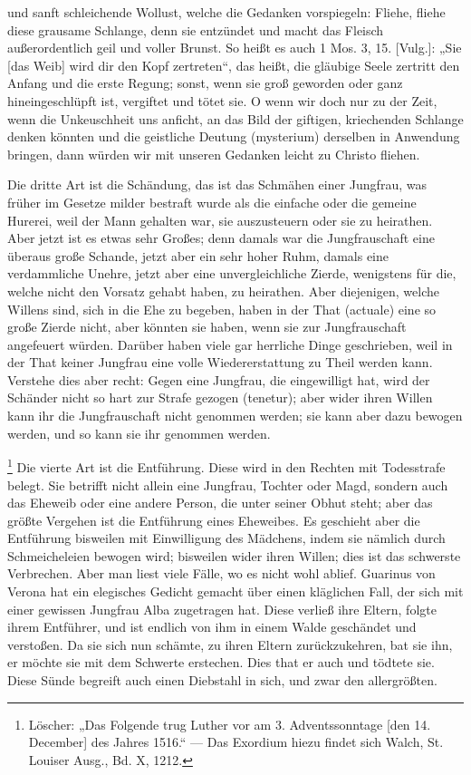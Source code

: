 und sanft schleichende Wollust, welche die Gedanken vorspiegeln: Fliehe, fliehe diese grausame Schlange, denn sie entzündet und macht das Fleisch außerordentlich geil und voller Brunst. So heißt es auch 1 Mos. 3, 15. [Vulg.]: „Sie [das Weib] wird dir den Kopf zertreten“, das heißt, die gläubige Seele zertritt den Anfang und die erste Regung; sonst, wenn sie groß geworden oder ganz hineingeschlüpft ist, vergiftet und tötet sie. O wenn wir doch nur zu der Zeit, wenn die Unkeuschheit uns anficht, an das Bild der giftigen, kriechenden Schlange denken könnten und die geistliche Deutung (mysterium) derselben in Anwendung bringen, dann würden wir mit unseren Gedanken leicht zu Christo fliehen.

Die dritte Art ist die Schändung, das ist das Schmähen einer Jungfrau, was früher im Gesetze milder bestraft wurde als die einfache oder die gemeine Hurerei, weil der Mann gehalten war, sie auszusteuern oder sie zu heirathen. Aber jetzt ist es etwas sehr Großes; denn damals war die Jungfrauschaft eine überaus große Schande, jetzt aber ein sehr hoher Ruhm, damals eine verdammliche Unehre, jetzt aber eine unvergleichliche Zierde, wenigstens für die, welche nicht den Vorsatz gehabt haben, zu heirathen. Aber diejenigen, welche Willens sind, sich in die Ehe zu begeben, haben in der That (actuale) eine so große Zierde nicht, aber könnten sie haben, wenn sie zur Jungfrauschaft angefeuert würden. Darüber haben viele gar herrliche Dinge geschrieben, weil in der That keiner Jungfrau eine volle Wiedererstattung zu Theil werden kann. Verstehe dies aber recht: Gegen eine Jungfrau, die eingewilligt hat, wird der Schänder nicht so hart zur Strafe gezogen (tenetur); aber wider ihren Willen kann ihr die Jungfrauschaft nicht genommen werden; sie kann aber dazu bewogen werden, und so kann sie ihr genommen werden.

\footnote{Löscher: „Das Folgende trug Luther vor am 3. Adventssonntage [den 14. December] des Jahres 1516.“ — Das Exordium hiezu findet sich Walch, St. Louiser Ausg., Bd. X, 1212.} Die vierte Art ist die Entführung. Diese wird in den Rechten mit Todesstrafe belegt. Sie betrifft nicht allein eine Jungfrau, Tochter oder Magd, sondern auch das Eheweib oder eine andere Person, die unter seiner Obhut steht; aber das größte Vergehen ist die Entführung eines Eheweibes. Es geschieht aber die Entführung bisweilen mit Einwilligung des Mädchens, indem sie nämlich durch Schmeicheleien bewogen wird; bisweilen wider ihren Willen; dies ist das schwerste Verbrechen. Aber man liest viele Fälle, wo es nicht wohl ablief. Guarinus von Verona hat ein elegisches Gedicht gemacht über einen kläglichen Fall, der sich mit einer gewissen Jungfrau Alba zugetragen hat. Diese verließ ihre Eltern, folgte ihrem Entführer, und ist endlich von ihm in einem Walde geschändet und verstoßen. Da sie sich nun schämte, zu ihren Eltern zurückzukehren, bat sie ihn, er möchte sie mit dem Schwerte erstechen. Dies that er auch und tödtete sie. Diese Sünde begreift auch einen Diebstahl in sich, und zwar den allergrößten.

